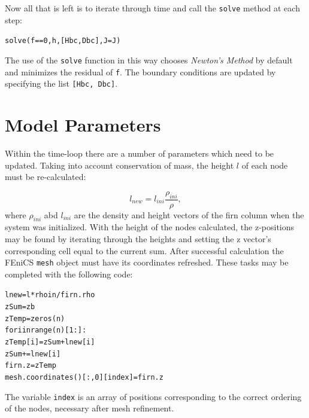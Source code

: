 \documentclass{article}%
\begin{document}
Now all that is left is to iterate through time and call the \texttt{solve} method at each step:\par
\footnotesize
\begin{alltt}
solve(f == 0, h, [Hbc, Dbc], J=J)
\end{alltt}
\normalsize
The use of the \texttt{solve} function in this way chooses \emph{Newton's Method} by default and minimizes the residual of \texttt{f}.  The boundary conditions are updated by specifying the list \texttt{[Hbc, Dbc]}.


\section{Model Parameters}

Within the time-loop there are a number of parameters which need to be updated.  Taking into account conservation of mass, the height $l$ of each node must be re-calculated:\par
  $$l_{new} = l_{ini} \frac{\rho_{ini}}{\rho},$$
where $\rho_{ini}$ abd $l_{ini}$ are the density and height vectors of the firn column when the system was initialized.  With the height of the nodes calculated, the z-positions may be found by iterating through the heights and setting the z vector's corresponding cell equal to the current sum.  After successful calculation the FEniCS \texttt{mesh} object must have its coordinates refreshed.  These tasks may be completed with the following code:\par
\footnotesize
\begin{alltt}
lnew     = l*rhoin / firn.rho
zSum     = zb
zTemp    = zeros(n)
for i in range(n)[1:]:
  zTemp[i] = zSum + lnew[i]
  zSum    += lnew[i]
firn.z  = zTemp
mesh.coordinates()[:,0][index] = firn.z
\end{alltt}
\normalsize
The variable \texttt{index} is an array of positions corresponding to the correct ordering of the nodes, necessary after mesh refinement.  
\end{document}
